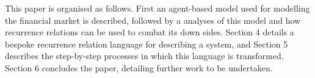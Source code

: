 \documentclass{article}
\begin{document}
This paper is organised as follows. First an agent-based model used for modelling the financial market is described, followed by a analyses of this model and how recurrence relations can be used to combat its down sides. Section 4 details a bespoke recurrence relation language for describing a system, and Section 5 describes the step-by-step processes in which this language is transformed. Section 6 concludes the paper, detailing further work to be undertaken.    
























\end{document}
